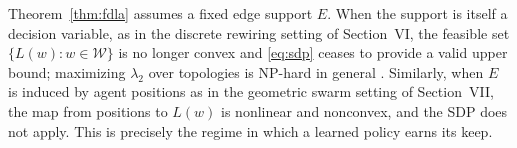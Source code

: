\begin{remark}
Theorem~\ref{thm:fdla} assumes a fixed edge support $E$. When the
support is itself a decision variable, as in the discrete rewiring
setting of Section~VI, the feasible set $\{L(w) : w \in \mathcal{W}\}$
is no longer convex and \eqref{eq:sdp} ceases to provide a valid upper
bound; maximizing $\lambda_2$ over topologies is NP-hard in general
\cite{Mosk2006}. Similarly, when $E$ is induced by agent positions as
in the geometric swarm setting of Section~VII, the map from positions
to $L(w)$ is nonlinear and nonconvex, and the SDP does not apply. This
is precisely the regime in which a learned policy earns its keep.
\end{remark}
